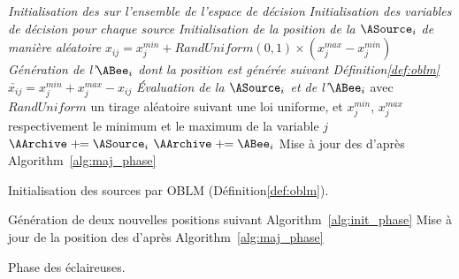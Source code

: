 \begin{algorithm}\label{alg:init_phase}
  \SetAlgoVlined
  \DontPrintSemicolon
  \emph{Initialisation des \ASources sur l’ensemble de l’espace de décision}\;
  {
    \emph{Initialisation des variables de décision pour chaque source}\;
    {
       \emph{Initialisation de la position de la $\ASource_{i}$ de manière aléatoire}\;
      \Indp
      $x_{ij} = x_{j}^{min} + RandUniform(0, 1) \times (x_{j}^{max} - x_{j}^{min})$\;
      \Indm
      \BlankLine
        \emph{Génération de l’$\ABee_{i}$ dont la position est générée suivant Définition\ref{def:oblm}}\;
      \Indp
      $ \check{x_{ij}} = x_{j}^{min} + x_{j}^{max} - x_{ij}$\;
      \Indm
      \BlankLine
       \emph{Évaluation de la $\ASource_{i}$ et de l’$\ABee_{i}$}\;
      \BlankLine
      avec $RandUniform$ un tirage aléatoire suivant une loi uniforme, et $x_{j}^{min}$, $x_{j}^{max}$
      respectivement le minimum et le maximum de la variable $j$\;
    }
    {
      $\AArchive \pluseq \ASource_{i}$ 
    }
    {
      $\AArchive \pluseq \ABee_{i}$ 
    }
  }
  Mise à jour des \ASources d’après Algorithm~\ref{alg:maj_phase}\;
  \caption{Initialisation des sources par OBLM (Définition\ref{def:oblm}).}
\end{algorithm}

\begin{algorithm}\label{alg:scout_phase}
  \SetAlgoVlined
  \DontPrintSemicolon
  {
    {
      Génération de deux nouvelles positions suivant Algorithm~\ref{alg:init_phase}\;
    }
  }
  Mise à jour de la position des \ASources d’après Algorithm~\ref{alg:maj_phase}\;
  \caption{Phase des éclaireuses.}
\end{algorithm}


